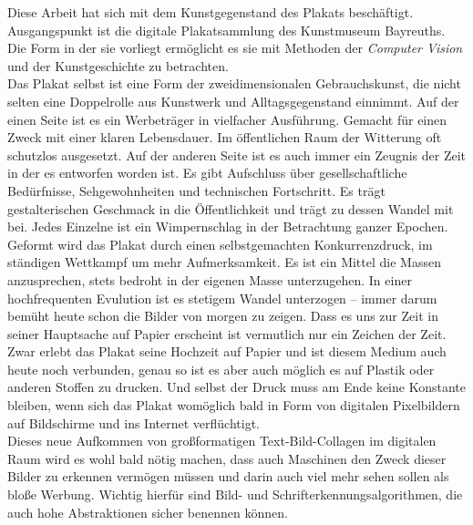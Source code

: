 \documentclass[a4paper,12pt,ngerman]{article}
\begin{document}
Diese Arbeit hat sich mit dem Kunstgegenstand des Plakats beschäftigt. Ausgangspunkt ist die digitale Plakatsammlung des Kunstmuseum Bayreuths. Die Form in der sie vorliegt ermöglicht es sie mit Methoden der \textit{Computer Vision} und der Kunstgeschichte zu betrachten. \\
Das Plakat selbst ist eine Form der zweidimensionalen Gebrauchskunst, die nicht selten eine Doppelrolle aus Kunstwerk und Alltagsgegenstand einnimmt. Auf der einen Seite ist es ein Werbeträger in vielfacher Ausführung. Gemacht für einen Zweck mit einer klaren Lebensdauer. Im öffentlichen Raum der Witterung oft schutzlos ausgesetzt. Auf der anderen Seite ist es auch immer ein Zeugnis der Zeit in der es entworfen worden ist. Es gibt Aufschluss über gesellschaftliche Bedürfnisse, Sehgewohnheiten und technischen Fortschritt. Es trägt gestalterischen Geschmack in die Öffentlichkeit und trägt zu dessen Wandel mit bei. Jedes Einzelne ist ein Wimpernschlag in der Betrachtung ganzer Epochen. Geformt wird das Plakat durch einen selbstgemachten Konkurrenzdruck, im ständigen Wettkampf um mehr Aufmerksamkeit. Es ist ein Mittel die Massen anzusprechen, stets bedroht in der eigenen Masse unterzugehen. In einer hochfrequenten Evulution ist es stetigem Wandel unterzogen -- immer darum bemüht heute schon die Bilder von morgen zu zeigen. Dass es uns zur Zeit in seiner Hauptsache auf Papier erscheint ist vermutlich nur ein Zeichen der Zeit. Zwar erlebt das Plakat seine Hochzeit auf Papier und ist diesem Medium auch heute noch verbunden, genau so ist es aber auch möglich es auf Plastik oder anderen Stoffen zu drucken. Und selbst der Druck muss am Ende keine Konstante bleiben, wenn sich das Plakat womöglich bald in Form von digitalen Pixelbildern auf Bildschirme und ins Internet verflüchtigt. \\
Dieses neue Aufkommen von großformatigen Text-Bild-Collagen im digitalen Raum wird es wohl bald nötig machen, dass auch Maschinen den Zweck dieser Bilder zu erkennen vermögen müssen und darin auch viel mehr sehen sollen als bloße Werbung. Wichtig hierfür sind Bild- und Schrifterkennungsalgorithmen, die auch hohe Abstraktionen sicher benennen können. \\
\end{document}
